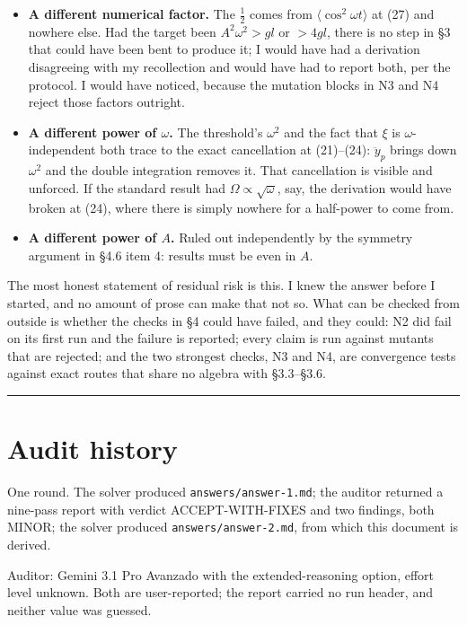 \documentclass[11pt,a4paper]{article}
\providecommand{\tightlist}{\setlength{\itemsep}{0pt}\setlength{\parskip}{0pt}}
\begin{document}
\begin{itemize}
\tightlist
\item
  \textbf{A different numerical factor.} The \(\tfrac12\) comes from
  \(\langle\cos^2\omega t\rangle\) at (27) and nowhere else. Had the target been
  \(A^2\omega^2>gl\) or \(>4gl\), there is no step in §3 that could have been bent
  to produce it; I would have had a derivation disagreeing with my recollection
  and would have had to report both, per the protocol. I would have noticed,
  because the mutation blocks in N3 and N4 reject those factors outright.
\item
  \textbf{A different power of \(\omega\).} The threshold's \(\omega^2\) and the fact
  that \(\xi\) is \(\omega\)-independent both trace to the exact cancellation at
  (21)--(24): \(\ddot y_p\) brings down \(\omega^2\) and the double integration
  removes it. That cancellation is visible and unforced. If the standard result
  had \(\Omega\propto\sqrt\omega\), say, the derivation would have broken at (24),
  where there is simply nowhere for a half-power to come from.
\item
  \textbf{A different power of \(A\).} Ruled out independently by the symmetry argument
  in §4.6 item 4: results must be even in \(A\).
\end{itemize}

The most honest statement of residual risk is this. I knew the answer before I
started, and no amount of prose can make that not so. What can be checked from
outside is whether the checks in §4 could have failed, and they could: N2 did
fail on its first run and the failure is reported; every claim is run against
mutants that are rejected; and the two strongest checks, N3 and N4, are
convergence tests against exact routes that share no algebra with §3.3--§3.6.

\begin{center}\rule{0.5\linewidth}{0.5pt}\end{center}


\section{Audit history}\label{app:audit}
One round. The solver produced \texttt{answers/answer-1.md}; the auditor
returned a nine-pass report with verdict ACCEPT-WITH-FIXES and two findings,
both MINOR; the solver produced \texttt{answers/answer-2.md}, from which this
document is derived.

Auditor: Gemini 3.1 Pro Avanzado with the extended-reasoning option, effort
level unknown. Both are user-reported; the report carried no run header, and
neither value was guessed.
\end{document}
